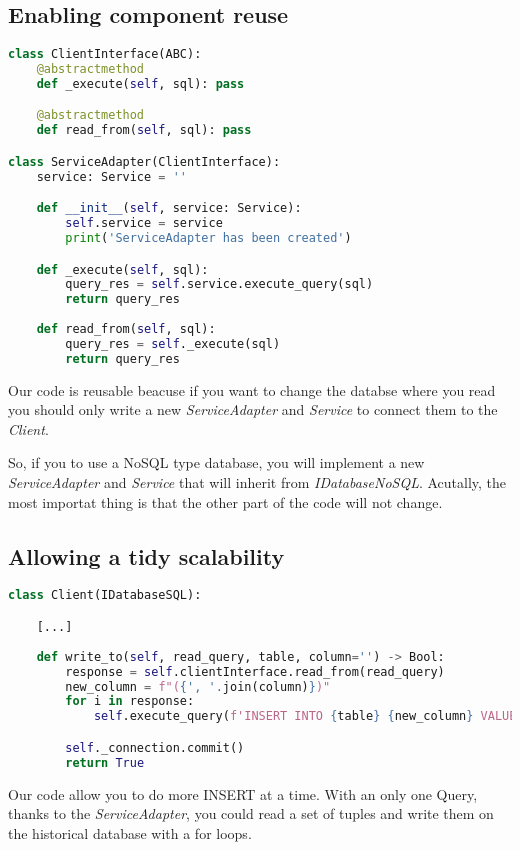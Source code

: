 \subsection{Enabling component reuse}

\begin{lstlisting}[language=Python]
class ClientInterface(ABC):
    @abstractmethod
    def _execute(self, sql): pass

    @abstractmethod
    def read_from(self, sql): pass

class ServiceAdapter(ClientInterface):
    service: Service = ''

    def __init__(self, service: Service):
        self.service = service
        print('ServiceAdapter has been created')

    def _execute(self, sql):
        query_res = self.service.execute_query(sql)
        return query_res
    
    def read_from(self, sql):
        query_res = self._execute(sql) 
        return query_res
\end{lstlisting}

Our code is reusable beacuse if you want to change the databse where you read you should only write a new \textit{ServiceAdapter} and \textit{Service} to connect them to the \textit{Client}.

So, if you to use a NoSQL type database, you will implement a new \textit{ServiceAdapter} and \textit{Service} that will inherit from \textit{IDatabaseNoSQL}. Acutally, the most importat thing is that the other part of the code will not change.

\subsection{Allowing a tidy scalability}

\begin{lstlisting}[language=Python]
class Client(IDatabaseSQL): 

	[...]
	
	def write_to(self, read_query, table, column='') -> Bool:
		response = self.clientInterface.read_from(read_query) 
		new_column = f"({', '.join(column)})"
		for i in response:
			self.execute_query(f'INSERT INTO {table} {new_column} VALUES {(i)};') 

		self._connection.commit()
		return True
\end{lstlisting}

Our code allow you to do more INSERT at a time. With an only one Query, thanks to the \textit{ServiceAdapter}, you could read a set of tuples and write them on the historical database with a for loops.

